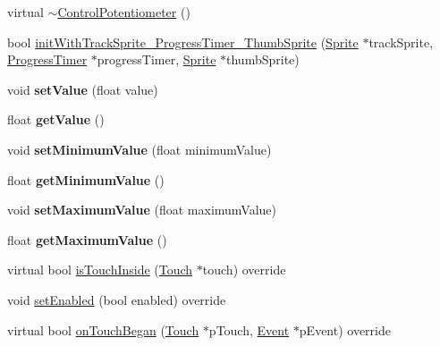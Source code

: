 \begin{DoxyCompactItemize}
\item 
virtual \hyperlink{classControlPotentiometer_a1fc184aae602d4f0421bdbe2a78395bc}{$\sim$\+Control\+Potentiometer} ()
\item 
bool \hyperlink{classControlPotentiometer_afac9c374d17a3eb0b1135ae0e0b55678}{init\+With\+Track\+Sprite\+\_\+\+Progress\+Timer\+\_\+\+Thumb\+Sprite} (\hyperlink{classSprite}{Sprite} $\ast$track\+Sprite, \hyperlink{classProgressTimer}{Progress\+Timer} $\ast$progress\+Timer, \hyperlink{classSprite}{Sprite} $\ast$thumb\+Sprite)
\item 
\mbox{\label{classControlPotentiometer_a92ff5779d9e8bbc06745797365f1fef9}} 
void {\bfseries set\+Value} (float value)
\item 
\mbox{\label{classControlPotentiometer_a4fa50bbde5f1ba432997462448e08cb3}} 
float {\bfseries get\+Value} ()
\item 
\mbox{\label{classControlPotentiometer_a5b70e36ef7a99d7401efe8170e298d33}} 
void {\bfseries set\+Minimum\+Value} (float minimum\+Value)
\item 
\mbox{\label{classControlPotentiometer_af1b1bd41d07a9b660ccd41e32b28635d}} 
float {\bfseries get\+Minimum\+Value} ()
\item 
\mbox{\label{classControlPotentiometer_a7328d2e17528991d2521584acbf43639}} 
void {\bfseries set\+Maximum\+Value} (float maximum\+Value)
\item 
\mbox{\label{classControlPotentiometer_adc44b9b0966427dcf339706258b8c0d5}} 
float {\bfseries get\+Maximum\+Value} ()
\item 
virtual bool \hyperlink{classControlPotentiometer_aa2bdcab40a678f249ee083c466064795}{is\+Touch\+Inside} (\hyperlink{classTouch}{Touch} $\ast$touch) override
\item 
void \hyperlink{classControlPotentiometer_ac67b583a3a21f6c44ffcf57b41c33278}{set\+Enabled} (bool enabled) override
\item 
virtual bool \hyperlink{classControlPotentiometer_a92d549b600c44bed4fd08d5ff13cbe8e}{on\+Touch\+Began} (\hyperlink{classTouch}{Touch} $\ast$p\+Touch, \hyperlink{classEvent}{Event} $\ast$p\+Event) override

\end{DoxyCompactItemize}
